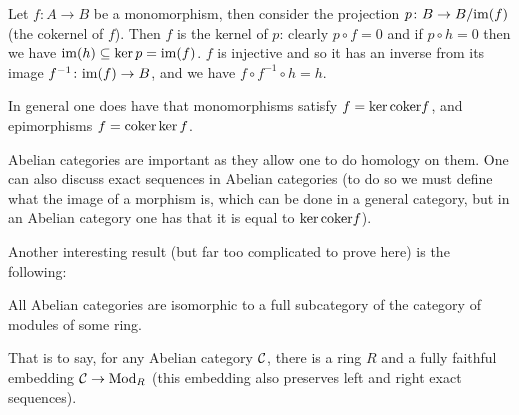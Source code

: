     Let $f\colon A\to B$ be a monomorphism, then consider the projection $p\colon B\to B/{\rm im}(f)$ (the cokernel of $f$).
    Then $f$ is the kernel of $p$: clearly $p\circ f=0$ and if $p\circ h=0$ then we have ${\rm im}(h)\subseteq\ker p={\rm im}(f)$.
    $f$ is injective and so it has an inverse from its image $f^{-1}\colon{\rm im}(f)\to B$, and we have $f\circ f^{-1}\circ h=h$.

\eexam

In general one does have that monomorphisms satisfy $f=\ker{\rm coker} f$, and epimorphisms $f={\rm coker}\ker f$.

Abelian categories are important as they allow one to do homology on them.
One can also discuss exact sequences in Abelian categories (to do so we must define what the image of a morphism is, which can be done in a general category, but in an Abelian category one
has that it is equal to $\ker{\rm coker} f$).

Another interesting result (but far too complicated to prove here) is the following:

\bthrm[title=Freyd-Mitchell]

    All Abelian categories are isomorphic to a full subcategory of the category of modules of some ring.

\ethrm

That is to say, for any Abelian category ${{\cal C}}$, there is a ring $R$ and a fully faithful embedding ${{\cal C}}\to{\rm Mod}_R$ (this embedding also preserves left and right exact sequences).

